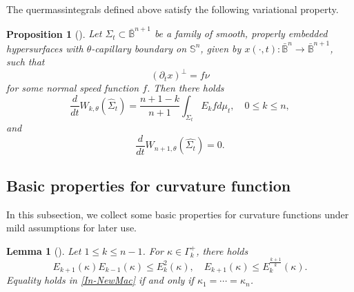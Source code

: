 \documentclass[11pt,reqno]{amsart}
\newtheorem{lem}[thm]{Lemma}
\newtheorem{prop}[thm]{Proposition}
\theoremstyle{definition}
\newtheorem{defn}[thm]{Definition}
\theoremstyle{remark}
\numberwithin{equation}{section}
\renewcommand{\(}{\left(}
\renewcommand{\)}{\right)}
\renewcommand{\-}{\overline}
\begin{document}
The quermassintegrals defined above satisfy the following variational property.

\begin{prop}[\cite{Weng-Xia2022}]
	Let $\Sigma_t\subset\bar{\mathbb{B}}^{n+1}$ be a family of smooth, properly embedded hypersurfaces with $\theta$-capillary boundary on $\mathbb{S}^n$, given by $x(\cdot,t):\bar{\mathbb{B}}^n\rightarrow \bar{\mathbb{B}}^{n+1}$, such that
	\begin{equation*}
		\left(\partial_tx\right)^\perp=f\nu
	\end{equation*}
	for some normal speed function $f$. Then there holds
	\begin{equation}\label{s2.dW}
		\frac{d}{dt}W_{k,\theta}(\widehat{\Sigma}_t)=\frac{n+1-k}{n+1}\int_{\Sigma_t}E_kfd\mu_t, \quad 0\leq k\leq n,
	\end{equation}	
		and
		\begin{equation}
		\frac{d}{dt}W_{n+1,\theta}(\widehat{\Sigma_t})=0.
			\end{equation}
\end{prop}
\subsection{Basic properties for curvature function} In this subsection,  we collect some basic properties for curvature functions under mild assumptions for later use.

	\begin{lem}[\cite{guan2014}]\label{Lemma-NMI}
		Let $1\leq k\leq n-1$. For $\kappa\in\Gamma_k^{+}$, there holds
		\begin{equation}\label{In-NewMac}
			E_{k+1}(\kappa)E_{k-1}(\kappa)\leq E_k^2(\kappa),\quad E_{k+1}(\kappa)\leq E_k^{\frac{k+1}{k}}(\kappa).
		\end{equation}
		Equality holds in \eqref{In-NewMac} if and only if $\kappa_1=\cdots=\kappa_n$.
	\end{lem}
\end{document}
